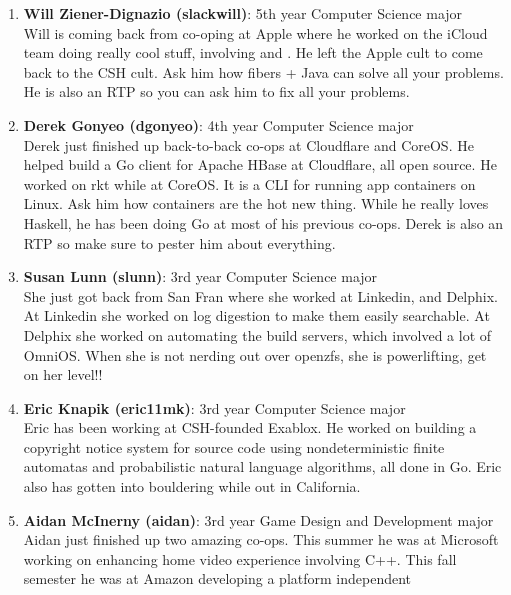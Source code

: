\documentclass[9pt]{extarticle}
\begin{document}
\begin{enumerate}
\item \textbf{Will Ziener-Dignazio (slackwill)}: 5th year Computer Science major \\
	Will is coming back from co-oping at Apple where he worked on the iCloud team 
	doing really cool stuff, involving  and . He left the Apple cult to come back to the CSH cult. Ask him
	how fibers + Java can solve all your problems. He is also an RTP so you
	can ask him to fix all your problems.
\\
\item \textbf{Derek Gonyeo (dgonyeo)}: 4th year Computer Science major \\
	Derek just finished up back-to-back co-ops at Cloudflare and CoreOS. He
	helped build a Go client for Apache HBase at Cloudflare, all open source.
	He worked on rkt while at CoreOS. It is a CLI for running app containers 
	on Linux. Ask him how containers are the hot new thing. While he really
	loves Haskell, he has been doing Go at most of his previous co-ops. Derek
	is also an RTP so make sure to pester him about everything.
\\
\item \textbf{Susan Lunn (slunn)}: 3rd year Computer Science major \\
	She just got back from San Fran where she worked at Linkedin, and Delphix.
	At Linkedin she worked on log digestion to make them easily searchable. At
	Delphix she worked on automating the build servers, which involved a lot 
	of OmniOS. When she is not nerding out over openzfs, she is powerlifting,
 	get on her level!!
\\
\item \textbf{Eric Knapik (eric11mk)}: 3rd year Computer Science major \\
	Eric has been working at CSH-founded Exablox. He worked on building a 
	copyright notice system for source code using nondeterministic finite 
	automatas and probabilistic natural language algorithms, all done in Go. 
	Eric also has gotten into bouldering while out in California. 
\\
\item \textbf{Aidan McInerny (aidan)}: 3rd year Game Design and Development major \\
	Aidan just finished up two amazing co-ops. This summer he was
	at Microsoft working on enhancing home video experience involving C++. 
	This fall semester he was at Amazon developing a platform independent 

\end{enumerate}
\end{document}
